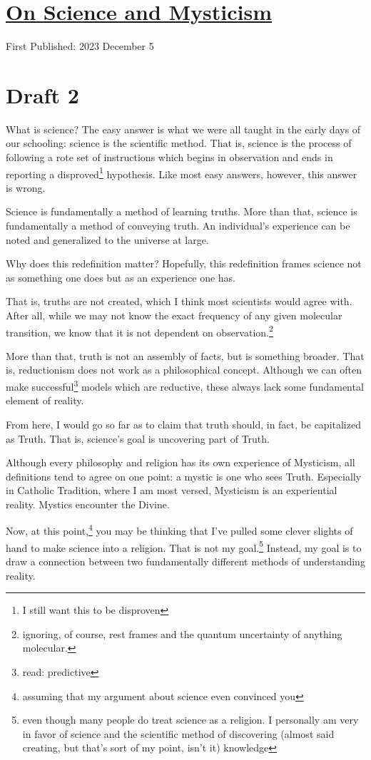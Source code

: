 \documentclass[12pt]{article}[titlepage]
\renewcommand{\,}{\textsuperscript{,}}
\begin{document}
\doublespacing
\section{\href{science-mysticism.html}{On Science and Mysticism}}
First Published: 2023 December 5
\section{Draft 2}
What is science?
The easy answer is what we were all taught in the early days of our schooling: science is the scientific method.
That is, science is the process of following a rote set of instructions which begins in observation and ends in reporting a disproved\footnote{I still want this to be disproven} hypothesis.
Like most easy answers, however, this answer is wrong.

Science is fundamentally a method of learning truths.
More than that, science is fundamentally a method of conveying truth.
An individual's experience can be noted and generalized to the universe at large.

Why does this redefinition matter?
Hopefully, this redefinition frames science not as something one does but as an experience one has.

That is, truths are not created, which I think most scientists would agree with.
After all, while we may not know the exact frequency of any given molecular transition, we know that it is not dependent on observation.\footnote{ignoring, of course, rest frames and the quantum uncertainty of anything molecular.}

More than that, truth is not an assembly of facts, but is something broader.
That is, reductionism does not work as a philosophical concept.
Although we can often make successful\footnote{read: predictive} models which are reductive, these always lack some fundamental element of reality.

From here, I would go so far as to claim that truth should, in fact, be capitalized as Truth.
That is, science's goal is uncovering part of Truth.

Although every philosophy and religion has its own experience of Mysticism, all definitions tend to agree on one point: a mystic is one who sees Truth.
Especially in Catholic Tradition, where I am most versed, Mysticism is an experiential reality.
Mystics encounter the Divine.

Now, at this point,\footnote{assuming that my argument about science even convinced you} you may be thinking that I've pulled some clever slights of hand to make science into a religion.
That is not my goal.\footnote{even though many people do treat science as a religion. I personally am very in favor of science and the scientific method of discovering (almost said creating, but that's sort of my point, isn't it) knowledge}
Instead, my goal is to draw a connection between two fundamentally different methods of understanding reality.
\end{document}
